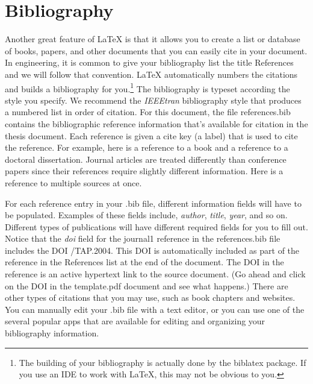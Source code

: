 \section{Bibliography}
Another great feature of \LaTeX{} is that it allows you to create a list or database of books, papers, and other documents that you can easily cite in your document. In engineering, it is common to give your bibliography list the title References and we will follow that convention. \LaTeX{} automatically numbers the citations and builds a bibliography for you.\footnote{The building of your bibliography is actually done by the {\ttfamily biblatex} package. If you use an IDE to work with \LaTeX, this may not be obvious to you.} The bibliography is typeset according the style you specify. We recommend the {\em IEEEtran} bibliography style that produces a numbered list in order of citation. For this document, the file {\ttfamily references.bib} contains the bibliographic reference information that's available for citation in the thesis document. Each reference is given a cite key (a label) that is used to cite the reference. For example, here is a reference to a book and a reference to a doctoral dissertation. Journal articles are treated differently than conference papers since their references require slightly different information. Here is a reference to multiple sources at once.

For each reference entry in your {\ttfamily .bib} file, different information fields will have to be populated. Examples of these fields include, {\em author}, {\em title}, {\em year}, and so on. Different types of publications will have different required fields for you to fill out. Notice that the {\em doi} field for the {\ttfamily journal1} reference in the {\ttfamily references.bib} file includes the DOI {/TAP.2004}. This DOI is automatically included as part of the reference in the References list at the end of the document. The DOI in the reference is an active hypertext link to the source document. (Go ahead and click on the DOI in the {\ttfamily template.pdf} document and see what happens.) There are other types of citations that you may use, such as book chapters and websites. You can manually edit your {\ttfamily .bib} file with a text editor, or you can use one of the several popular apps that are available for editing and organizing your bibliography information.

